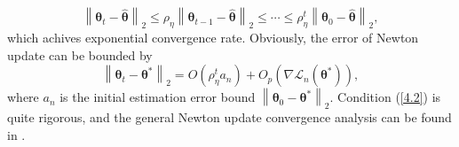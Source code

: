 \documentclass[12pt]{article}
\numberwithin{equation}{section}
\begin{document}
$$
\left\|\boldsymbol{\theta}_t-\widehat{\boldsymbol{\theta}}\right\|_2\leq \rho_{\eta}\left\|\boldsymbol{\theta}_{t-1}-\widehat{\boldsymbol{\theta}}\right\|_2\leq \cdots \leq \rho_{\eta}^t\left\|\boldsymbol{\theta}_{0}-\widehat{\boldsymbol{\theta}}\right\|_2,
$$
which achives exponential convergence rate. Obviously, the error of Newton update can be bounded by
$$
\left\|\boldsymbol{\theta}_t-\boldsymbol{\theta}^{*}\right\|_2=O\left(\rho_{\eta}^ta_n\right)+O_p\left(\nabla\mathcal{L}_n(\boldsymbol{\theta}^{*})\right),
$$
where $a_n$ is the initial estimation error bound $\left\|\boldsymbol{\theta}_0-\boldsymbol{\theta}^{*}\right\|_2$.
Condition (\ref{4.2}) is quite rigorous, and the general Newton update convergence analysis can be found in \citet{boyd2004convex}.

\end{document}

